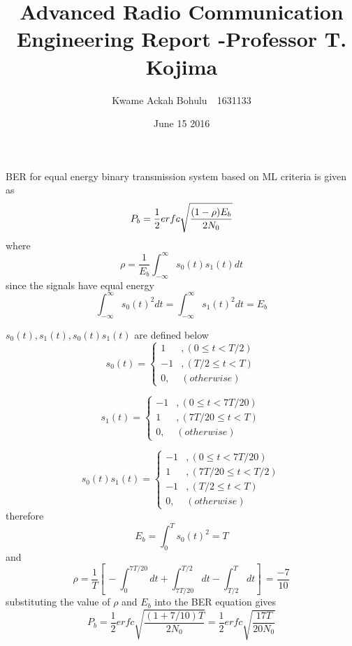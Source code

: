 \documentclass[24 pts]{article}
\title{Advanced Radio Communication Engineering Report -Professor T. Kojima }
\date{June 15 2016}
\author{Kwame Ackah Bohulu　1631133}
\begin{document}
\maketitle
[1]BER for equal energy binary transmission system based on ML criteria is given as 
\begin{equation*}
P_b = \frac{1}{2}erfc\sqrt{\frac{(1-\rho)E_b}{2N_0}}\\
\end{equation*}
where
\begin{equation*}
\rho =\frac{1}{E_b}\int_{-\infty}^{\infty}s_0(t) s_1(t)dt
\end{equation*}
since the signals have equal energy 
$$\int_{-\infty}^{\infty}s_0(t) ^2dt=\int_{-\infty}^{\infty}s_1(t) ^2dt=E_b$$

$s_0(t),s_1(t),s_0(t)s_1(t)$ are defined below
\[
s_0(t)=
\begin{cases}
1&,(0\leq t<T/2)\\
-1&,(T/2\leq t<T)\\
0,&(otherwise)
 \end{cases}
\]

\[
s_1(t)=
\begin{cases}
-1&,(0\leq t<7T/20)\\
1&,(7T/20\leq t<T)\\
0,&(otherwise)
 \end{cases}
\]

\[
s_0(t)s_1(t)=
\begin{cases}
-1&,(0\leq t<7T/20)\\
1&,(7T/20\leq t<T/2)\\
-1&,(T/2\leq t<T)\\
0,&(otherwise)
 \end{cases}
\]
therefore
$$E_b=\int_{0}^{T}s_0(t) ^2=T$$
and
$$\rho=\frac{1}{T}\left[\,-\int_{0}^{7T/20}dt+\int_{7T/20}^{T/2}dt-\int_{T/2}^{T}dt\right]\,=\frac{-7}{10}$$
substituting the value of $\rho$ and $E_b$ into the BER equation gives
$$P_b = \frac{1}{2}erfc\sqrt{\frac{(1+7/10)T}{2N_0}} =\frac{1}{2}erfc\sqrt{\frac{17T}{20N_0}}$$ 
\end{document}
